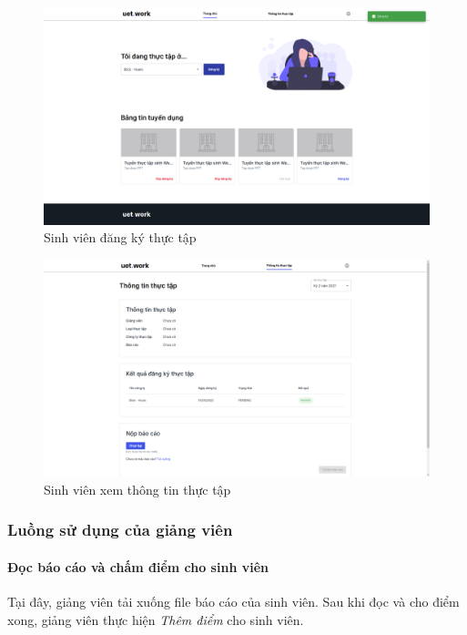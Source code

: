 \documentclass[./../main.tex]{subfiles}
\begin{document}
\begin{figure}[]
	\includegraphics[width=\linewidth]{./images/image15.png}
	\caption{Sinh viên đăng ký thực tập}
	\label{fig:student_page}
\end{figure}

\begin{figure}[]
	\includegraphics[width=\linewidth]{./images/image17.png}
	\caption{Sinh viên xem thông tin thực tập}
	\label{fig:view_internship_page}
\end{figure}

\subsubsection{Luồng sử dụng của giảng viên}

\paragraph*{Đọc báo cáo và chấm điểm cho sinh viên}

Tại đây, giảng viên tải xuống file báo cáo của sinh viên. Sau khi đọc và cho điểm xong, giảng viên thực hiện \emph{Thêm điểm} cho sinh viên.
\end{document}
